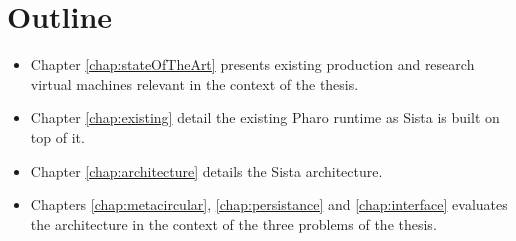 \documentclass[a4paper,12pt,twoside]{../includes/ThesisStyle}
\begin{document}
\section{Outline}

\begin{itemize}
	\item Chapter \ref{chap:stateOfTheArt} presents existing production and research virtual machines relevant in the context of the thesis. 
	\item Chapter \ref{chap:existing} detail the existing Pharo runtime as Sista is built on top of it.
	\item Chapter \ref{chap:architecture} details the Sista architecture. 
	\item Chapters \ref{chap:metacircular}, \ref{chap:persistance} and \ref{chap:interface} evaluates the architecture in the context of the three problems of the thesis.
\end{itemize}



\ifx\wholebook\relax\else
    
\end{document}
